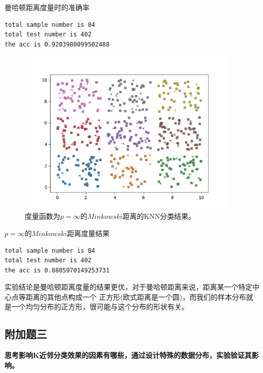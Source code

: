 \documentclass{article}
\begin{document}
 曼哈顿距离度量时的准确率
 \begin{verbatim}
total sample number is 84
total test number is 402
the acc is 0.9203980099502488
\end{verbatim}
 \begin{figure}[H]
    \centering
    \begin{minipage}[t]{1.0\linewidth}
        \centering
        \includegraphics[height=8cm]{inf2.png}
        \caption{度量函数为$p=\infty$的$Minkowski$距离的KNN分类结果。}
    \end{minipage}
 \end{figure}
 $p=\infty$的$Minkowski$距离度量结果
 \begin{verbatim}
total sample number is 84
total test number is 402
the acc is 0.8805970149253731
\end{verbatim}


实验结论是曼哈顿距离度量的结果更优，对于曼哈顿距离来说，距离某一个特定中心点等距离的其他点构成一个
正方形(欧式距离是一个圆)，而我们的样本分布就是一个均匀分布的正方形，很可能与这个分布的形状有关。


\subsection*{\Large 附加题三}
{\large\textbf{思考影响K近邻分类效果的因素有哪些，通过设计特殊的数据分布，实验验证其影响。}}
\end{document}
